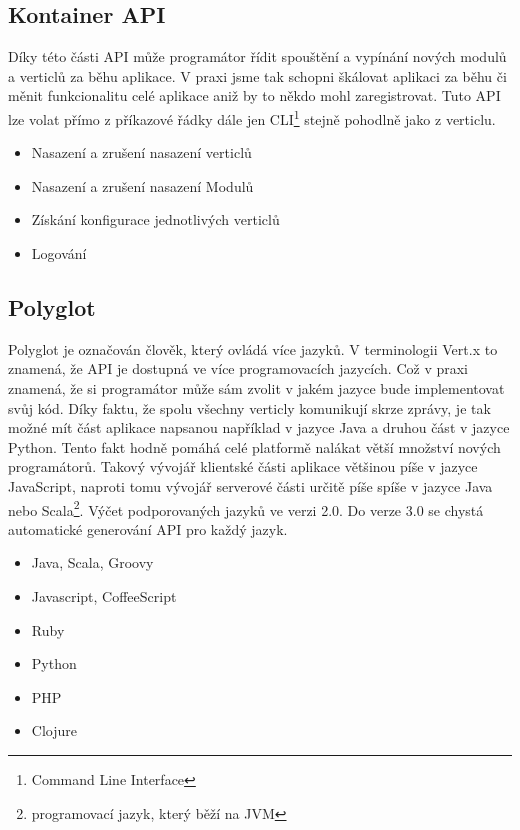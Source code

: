 \subsection{Kontainer API}

Díky této části API může programátor řídit spouštění a vypínání nových modulů a verticlů za běhu aplikace. V praxi jsme tak schopni škálovat aplikaci za běhu či měnit funkcionalitu celé aplikace aniž by to někdo mohl zaregistrovat. Tuto API lze volat přímo z příkazové řádky dále jen CLI\footnote{Command Line Interface} stejně pohodlně jako z verticlu.

\begin{itemize}
\item{Nasazení a zrušení nasazení verticlů}
\item{Nasazení a zrušení nasazení Modulů}
\item{Získání konfigurace jednotlivých verticlů}
\item{Logování}
\end{itemize}

\subsection{Polyglot}

Polyglot je označován člověk, který ovládá více jazyků. V terminologii Vert.x to znamená, že API je dostupná ve více programovacích jazycích. Což v praxi znamená, že si programátor může sám zvolit v jakém jazyce bude implementovat svůj kód. Díky faktu, že spolu všechny verticly komunikují skrze zprávy, je tak možné mít část aplikace napsanou například v jazyce Java a druhou část v jazyce Python. Tento fakt hodně pomáhá celé platformě nalákat větší množství nových programátorů. Takový vývojář klientské části aplikace většinou píše v jazyce JavaScript, naproti tomu vývojář serverové části určitě píše spíše v jazyce Java nebo Scala\footnote{programovací jazyk, který běží na JVM}. Výčet podporovaných jazyků ve verzi 2.0. Do verze 3.0 se chystá automatické generování API pro každý jazyk.

\begin{itemize}
\item{Java, Scala, Groovy}
\item{Javascript, CoffeeScript}
\item{Ruby}
\item{Python}
\item{PHP}
\item{Clojure}
\end{itemize}

